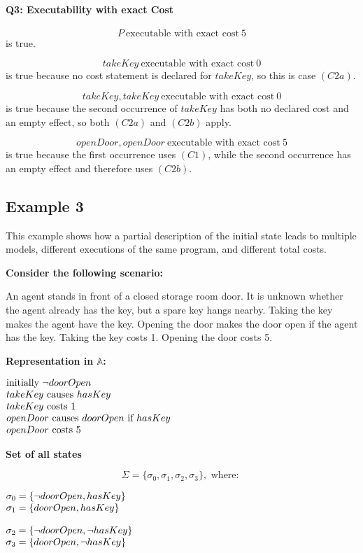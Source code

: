 \documentclass[11pt]{article}
\makeatletter
\newcommand{\states}{\Sigma}
\newcommand{\scenarioheader}{\par\noindent\textbf{Consider the following scenario:}\par}
\newcommand{\repheader}{\par\noindent\textbf{Representation in \(\mathbb{A}\):}\par}
\newcommand{\exampleblocktitle}[1]{\par\medskip\noindent\textbf{#1}\par\smallskip}
\newenvironment{centeredleftblock}[1][0.78\textwidth]
{\begin{center}\begin{minipage}{#1}\raggedright}
{\end{minipage}\end{center}}
\newenvironment{statementblock}
{\begin{flushleft}\renewcommand{\arraystretch}{1.1}\(\begin{array}{@{}l@{}}}
{\end{array}\)\end{flushleft}}
\makeatother
\begin{document}
\paragraph{Q3: Executability with exact Cost}
\[
P ~\text{executable with exact cost}~ 5
\]
is true.

\[
takeKey ~\text{executable with exact cost}~ 0
\]
is true because no cost statement is declared for \(takeKey\), so this is case
\((C2a)\).

\[
takeKey, takeKey ~\text{executable with exact cost}~ 0
\]
is true because the second occurrence of \(takeKey\) has both no declared cost
and an empty effect, so both \((C2a)\) and \((C2b)\) apply.

\[
openDoor, openDoor ~\text{executable with exact cost}~ 5
\]
is true because the first occurrence uses \((C1)\), while the second
occurrence has an empty effect and therefore uses \((C2b)\).

\subsection*{Example 3}
This example shows how a partial description of the initial state leads to
multiple models, different executions of the same program, and different total
costs.

\scenarioheader
An agent stands in front of a closed storage room door. It is unknown whether
the agent already has the key, but a spare key hangs nearby. Taking the key
makes the agent have the key. Opening the door makes the door open if the
agent has the key. Taking the key costs 1. Opening the door costs 5.

\repheader
\begin{centeredleftblock}[0.62\textwidth]
\begin{statementblock}
\text{initially}~ \neg doorOpen \\
takeKey ~\text{causes}~ hasKey \\
takeKey ~\text{costs}~ 1 \\
openDoor ~\text{causes}~ doorOpen ~\text{if}~ hasKey \\
openDoor ~\text{costs}~ 5
\end{statementblock}
\end{centeredleftblock}


\exampleblocktitle{Set of all states}
\[
\states = \{\sigma_0, \sigma_1, \sigma_2, \sigma_3\},\text{ where: }
\]
\noindent
\begin{minipage}[t]{0.47\textwidth}
\begin{statementblock}
\sigma_0 = \{\neg doorOpen, hasKey\} \\
\sigma_1 = \{doorOpen, hasKey\}
\end{statementblock}
\end{minipage}
\hfill
\begin{minipage}[t]{0.47\textwidth}
\begin{statementblock}
\sigma_2 = \{\neg doorOpen, \neg hasKey\} \\
\sigma_3 = \{doorOpen, \neg hasKey\}
\end{statementblock}
\end{minipage}
\end{document}
